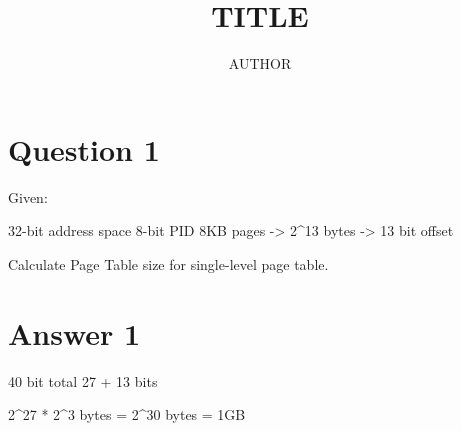 \documentclass{article}
\title{TITLE}
\author{AUTHOR}
\date{}
\begin{document}
\section{Question 1}

Given:

32-bit address space
8-bit PID
8KB pages -> 2^13 bytes -> 13 bit offset

Calculate Page Table size for single-level page table.

\section{Answer 1}

40 bit total
27 + 13 bits

2^27 * 2^3 bytes = 2^30 bytes = 1GB
\end{document}
